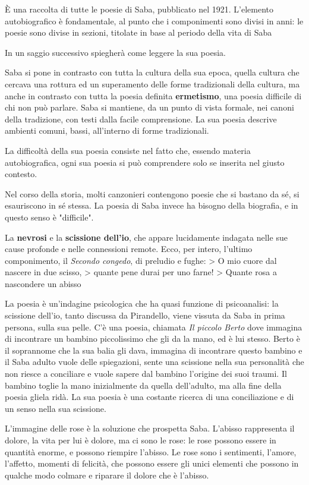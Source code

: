 È una raccolta di tutte le poesie di Saba, pubblicato nel 1921.
L'elemento autobiografico è fondamentale, al punto che i componimenti sono divisi in anni: le poesie sono divise in sezioni, titolate in base al periodo della vita di Saba %

In un saggio successivo spiegherà come leggere la sua poesia.

Saba si pone in contrasto con tutta la cultura della sua epoca, quella cultura che cercava una rottura ed un superamento delle forme tradizionali della cultura, ma anche in contrasto con tutta la poesia definita \textbf{ermetismo}, una poesia difficile di chi non può parlare.
Saba si mantiene, da un punto di vista formale, nei canoni della tradizione, con testi dalla facile comprensione.
La sua poesia descrive ambienti comuni, bassi, all'interno di forme tradizionali.

La difficoltà della sua poesia consiste nel fatto che, essendo materia autobiografica, ogni sua poesia si può comprendere solo se inserita nel giusto contesto.

Nel corso della storia, molti canzonieri contengono poesie che si bastano da sé, si esauriscono in sé stessa. La poesia di Saba invece ha bisogno della biografia, e in questo senso è "difficile".

La \textbf{nevrosi} e la \textbf{scissione dell'io}, che appare lucidamente indagata nelle sue cause profonde e nelle connessioni remote. Ecco, per intero, l'ultimo componimento, il \textit{Secondo congedo}, di preludio e fughe:
> O mio cuore dal nascere in due scisso,
> quante pene durai per uno farne!
> Quante rosa a nascondere un abisso

La poesia è un'indagine psicologica che ha quasi funzione di psicoanalisi: la scissione dell'io, tanto discussa da Pirandello, viene vissuta da Saba in prima persona, sulla sua pelle. C’è una poesia, chiamata \textit{Il piccolo Berto} dove immagina di incontrare un bambino piccolissimo che gli da la mano, ed è lui stesso. Berto è il soprannome che la sua balia gli dava, immagina di incontrare questo bambino e il Saba adulto vuole delle spiegazioni, sente una scissione nella sua personalità che non riesce a conciliare e vuole sapere dal bambino l’origine dei suoi traumi. Il bambino toglie la mano inizialmente da quella dell’adulto, ma alla fine della poesia gliela ridà. La sua poesia è una costante ricerca di una conciliazione e di un senso nella sua scissione.

L'immagine delle rose è la soluzione che prospetta Saba. L'abisso rappresenta il dolore, la vita per lui è dolore, ma ci sono le rose: le rose possono essere in quantità enorme, e possono riempire l'abisso.
Le rose sono i sentimenti, l'amore, l'affetto, momenti di felicità, che possono essere gli unici elementi che possono in qualche modo colmare e riparare il dolore che è l'abisso.

